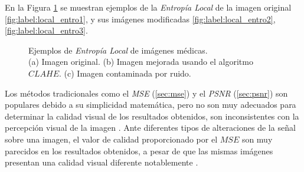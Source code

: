 En la Figura \ref{fig:local_entropy} se muestran ejemplos de la \textit{Entropía Local} de la imagen original \ref{fig:label:local_entro1}, y sus imágenes modificadas \ref{fig:label:local_entro2}, \ref{fig:label:local_entro3}.

\begin{figure}[H]
    \begin{center}
    \end{center}
    \caption{Ejemplos de \textit{Entropía Local} de imágenes médicas. \\
    (a) Imagen original.
    (b) Imagen mejorada usando el algoritmo $CLAHE$.
    (c) Imagen contaminada por ruido.}
    \label{fig:local_entropy}
\end{figure}


Los métodos tradicionales como el \textit{MSE} (\ref{sec:mse}) y el \textit{PSNR} (\ref{sec:psnr}) son populares debido a su simplicidad matemática, pero no son muy adecuados para determinar la calidad visual de los resultados obtenidos, son inconsistentes con la percepción visual de la imagen \cite{gsim2012}. Ante diferentes tipos de alteraciones de la señal sobre una imagen, el valor de calidad proporcionado por el $MSE$ son muy parecidos en los resultados obtenidos, a pesar de que las mismas imágenes presentan una calidad visual diferente notablemente \cite{wang2009}.

